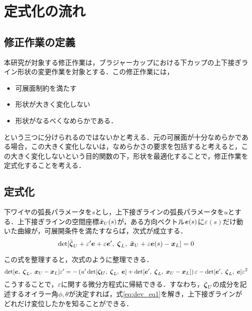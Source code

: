 \newcommand{\STP}[3]{\det[#1,\; #2,\; #3]}

\section{定式化の流れ}
	\subsection{修正作業の定義}
		本研究が対象する修正作業は，ブラジャーカップにおける下カップの上下接ぎライン形状の変更作業を対象とする．この修正作業には，
		\begin{itemize}
			\item 可展面制約を満たす
			\item 形状が大きく変化しない
			\item 形状がなるべくなめらかである．
		\end{itemize}
		という三つに分けられるのではないかと考える．元の可展面が十分なめらかである場合，この大きく変化しないは，なめらかさの要求を包括すると考えると，この大きく変化しないという目的関数の下，形状を最適化することで，修正作業を定式化することを考える．
		
	\subsection{定式化}
		下ワイヤの弧長パラメータを$ s $とし，上下接ぎラインの弧長パラメータを$ u $とする．上下接ぎラインの空間座標$ \tilde{\boldsymbol{x}}_U(s) $が，ある方向ベクトル$ \boldsymbol{e}(s) $に$ \varepsilon(s) $だけ動いた曲線が，可展開条件を満たすならば，次式が成立する．
		\begin{equation}\label{eq:dev_eq}
			\det[\tilde{\boldsymbol{\zeta}}_U + \varepsilon' \boldsymbol{e} + \varepsilon \boldsymbol{e}' ,\;\boldsymbol{\zeta}_L,\;\tilde{\boldsymbol{x}}_U + \varepsilon \boldsymbol{e}(s) - \boldsymbol{x}_L] = 0
		\end{equation}
		
		この式を整理すると，次式のように整理できる．
		\begin{equation}\label{eq:dev_eq1}
			\det[\bd{e},\; \bd{\zeta}_L,\; \bd{x}_U - \bd{x}_L]\varepsilon' = -\left( u' \STP{\bd{\zeta_U}}{\bd{\zeta}_L}{\bd{e}} + \STP{\bd{e}'}{\bd{\zeta}_L}{\bd{x}_U - \bd{x}_L}\right)\varepsilon - \STP{\bd{e}'}{\bd{\zeta}_L}{\bd{e}} \varepsilon^2
		\end{equation}
		こうすることで，$ \varepsilon $に関する微分方程式に帰結できる．すなわち，$ \boldsymbol{\zeta}_U $の成分を記述するオイラー角$ \phi,\theta $が決定すれば，式\ref{eq:dev_eq1}を解き，上下接ぎラインがどれだけ変位したかを知ることができる．
		
